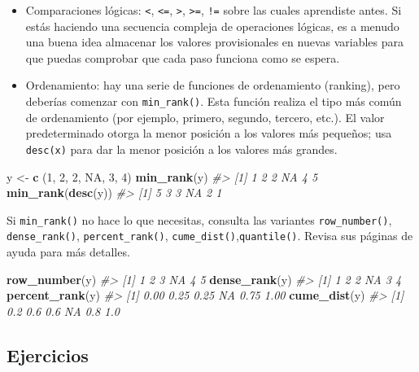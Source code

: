\documentclass[11pt,oneside]{report}
\newenvironment{Shaded}{\begin{snugshade}}{\end{snugshade}}
\newcommand{\CommentTok}[1]{\textcolor[rgb]{0.56,0.35,0.01}{\textit{#1}}}
\newcommand{\DecValTok}[1]{\textcolor[rgb]{0.00,0.00,0.81}{#1}}
\newcommand{\KeywordTok}[1]{\textcolor[rgb]{0.13,0.29,0.53}{\textbf{#1}}}
\newcommand{\NormalTok}[1]{#1}
\newcommand{\OtherTok}[1]{\textcolor[rgb]{0.56,0.35,0.01}{#1}}
\newcommand{\StringTok}[1]{\textcolor[rgb]{0.31,0.60,0.02}{#1}}
\begin{document}
\begin{itemize}
\item
  Comparaciones lógicas: \texttt{\textless{}}, \texttt{\textless{}=},
  \texttt{\textgreater{}}, \texttt{\textgreater{}=}, \texttt{!=} sobre
  las cuales aprendiste antes. Si estás haciendo una secuencia compleja
  de operaciones lógicas, es a menudo una buena idea almacenar los
  valores provisionales en nuevas variables para que puedas comprobar
  que cada paso funciona como se espera.
\item
  Ordenamiento: hay una serie de funciones de ordenamiento (ranking),
  pero deberías comenzar con \texttt{min\_rank()}. Esta función realiza
  el tipo más común de ordenamiento (por ejemplo, primero, segundo,
  tercero, etc.). El valor predeterminado otorga la menor posición a los
  valores más pequeños; usa \texttt{desc(x)} para dar la menor posición
  a los valores más grandes.
\end{itemize}

\begin{Shaded}
\begin{Highlighting}[]
\NormalTok{y <-}\StringTok{ }\KeywordTok{c}\NormalTok{ (}\DecValTok{1}\NormalTok{, }\DecValTok{2}\NormalTok{, }\DecValTok{2}\NormalTok{, }\OtherTok{NA}\NormalTok{, }\DecValTok{3}\NormalTok{, }\DecValTok{4}\NormalTok{)}
\KeywordTok{min_rank}\NormalTok{(y)}
\CommentTok{#> [1]  1  2  2 NA  4  5}
\KeywordTok{min_rank}\NormalTok{(}\KeywordTok{desc}\NormalTok{(y))}
\CommentTok{#> [1]  5  3  3 NA  2  1}
\end{Highlighting}
\end{Shaded}

Si \texttt{min\_rank()} no hace lo que necesitas, consulta las variantes
\texttt{row\_number()}, \texttt{dense\_rank()},
\texttt{percent\_rank()}, \texttt{cume\_dist()},\texttt{quantile()}.
Revisa sus páginas de ayuda para más detalles.

\begin{Shaded}
\begin{Highlighting}[]
\KeywordTok{row_number}\NormalTok{(y)}
\CommentTok{#> [1]  1  2  3 NA  4  5}
\KeywordTok{dense_rank}\NormalTok{(y)}
\CommentTok{#> [1]  1  2  2 NA  3  4}
\KeywordTok{percent_rank}\NormalTok{(y)}
\CommentTok{#> [1] 0.00 0.25 0.25   NA 0.75 1.00}
\KeywordTok{cume_dist}\NormalTok{(y)}
\CommentTok{#> [1] 0.2 0.6 0.6  NA 0.8 1.0}
\end{Highlighting}
\end{Shaded}

\hypertarget{ejercicios-11}{%
\subsection{Ejercicios}\label{ejercicios-11}}
\end{document}
